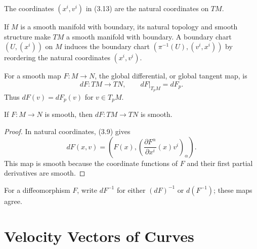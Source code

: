 \begin{notation}
\label{not:3-16-extra-2}



The coordinates $(x^i,v^i)$ in (3.13) are the natural coordinates on $TM$.
\end{notation}

\begin{proposition}
\label{exer:3-19}




If $M$ is a smooth manifold with boundary, its natural topology and smooth
structure make $TM$ a smooth manifold with boundary. A boundary chart
$(U,(x^i))$ on $M$ induces the boundary chart
$(\pi^{-1}(U),(v^i,x^i))$ by reordering the natural coordinates
$(x^i,v^i)$.
\end{proposition}

\begin{definition}
\label{def:3-16-extra-3}



For a smooth map $F:M\to N$, the global differential, or global tangent map,
is
\[
dF:TM\to TN,
\qquad dF|_{T_pM}=dF_p.
\]
Thus $dF(v)=dF_p(v)$ for $v\in T_pM$.
\end{definition}

\begin{proposition}
\label{prop:3-21}



If $F:M\to N$ is smooth, then $dF:TM\to TN$ is smooth.
\end{proposition}

\begin{proof}
\sketch
In natural coordinates, (3.9) gives
\[
dF(x,v)=
\left(F(x),
\left(\frac{\partial F^\alpha}{\partial x^i}(x)v^i\right)_\alpha\right).
\]
This map is smooth because the coordinate functions of $F$ and their first
partial derivatives are smooth.
\end{proof}

\begin{notation}
\label{not:3-16-extra-4}




For a diffeomorphism $F$, write $dF^{-1}$ for either $(dF)^{-1}$ or
$d(F^{-1})$; these maps agree.
\end{notation}


\section{Velocity Vectors of Curves}

